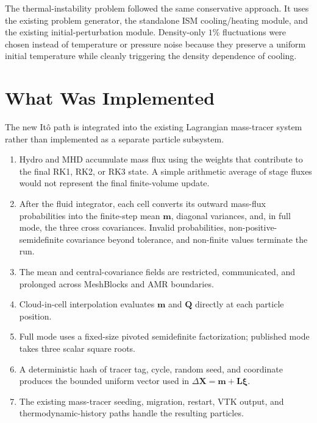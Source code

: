 \documentclass[11pt]{article}
\newcommand{\Ito}{It\^o}
\newcommand{\artifact}[1]{\path{#1}}
\begin{document}
The thermal-instability problem followed the same conservative approach. It
uses the existing \artifact{cooling_test} problem generator, the standalone
ISM cooling/heating module, and the existing initial-perturbation module.
Density-only \(1\%\) fluctuations were chosen instead of temperature or
pressure noise because they preserve a uniform initial temperature while
cleanly triggering the density dependence of cooling.

\section{What Was Implemented}

The new \Ito{} path is integrated into the existing Lagrangian mass-tracer
system rather than implemented as a separate particle subsystem.

\begin{enumerate}
  \item Hydro and MHD accumulate mass flux using the weights that contribute
        to the final RK1, RK2, or RK3 state. A simple arithmetic average of
        stage fluxes would not represent the final finite-volume update.
  \item After the fluid integrator, each cell converts its outward mass-flux
        probabilities into the finite-step mean \(\mathbf m\), diagonal
        variances, and, in full mode, the three cross covariances. Invalid
        probabilities, non-positive-semidefinite covariance beyond tolerance,
        and non-finite values terminate the run.
  \item The mean and central-covariance fields are restricted, communicated,
        and prolonged across MeshBlocks and AMR boundaries.
  \item Cloud-in-cell interpolation evaluates \(\mathbf m\) and \(\mathbf Q\)
        directly at each particle position.
  \item Full mode uses a fixed-size pivoted semidefinite factorization;
        published mode takes three scalar square roots.
  \item A deterministic hash of tracer tag, cycle, random seed, and coordinate
        produces the bounded uniform vector used in
        \(\Delta\mathbf X=\mathbf m+\mathbf L\boldsymbol{\xi}\).
  \item The existing mass-tracer seeding, migration, restart, VTK output, and
        thermodynamic-history paths handle the resulting particles.
\end{enumerate}
\end{document}
